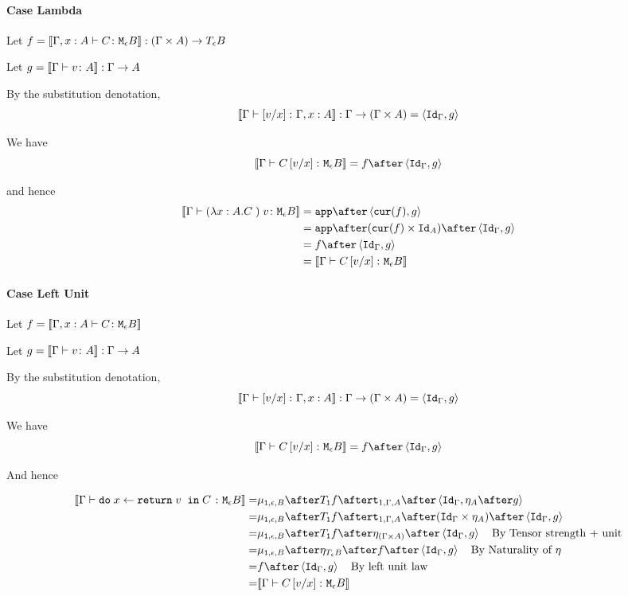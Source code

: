 {\paragraph{Case Lambda}
    Let $f = \deno{\typerelation{\gax}{C}{\meb}}: (\G \times A) \rightarrow\teb$

    Let $g = \deno{\gtyperelation{v}{A}}: \G \rightarrow A$

    By the substitution denotation, $$\deno{\typerelation{\G}{\ssub{x}{v}}{\gax}}: \G \rightarrow (\G \times A) = \pr{\idg}{g}$$

    We have $$\deno{\gtyperelation{C\ssub{x}{v}}{\meb}} = f \after \pr{\idg}{g}$$

    and hence
    \begin{equation}
        \begin{split}
            \deno{\gtyperelation{\apply{(\lam{x}{A}{C})}{v}}{\meb}} & = \app\after\pr{\cur{f}}{g} \\
            & = \app\after(\cur{f}\times\Id{A})\after\pr{\idg}{g}\\
            & = f \after \pr{\idg}{g} \\
            & = \deno{\gtyperelation{C\ssub{x}{v}}{\meb}}  
        \end{split}
    \end{equation}
   

\paragraph{Case Left Unit}
Let $f = \deno{\typerelation{\gax}{C}{\meb}}$

Let $g = \deno{\gtyperelation{v}{A}}: \G \rightarrow A$

By the substitution denotation, $$\deno{\typerelation{\G}{\ssub{x}{v}}{\gax}}: \G \rightarrow (\G \times A) = \pr{\idg}{g}$$

We have $$\deno{\gtyperelation{C\ssub{x}{v}}{\meb}} = f \after \pr{\idg}{g}$$

And hence

\begin{equation}
    \begin{split}
        \deno{\gtyperelation{\doin{x}{\return{v}}{C}}{\meb}} = &  \bind{\1}{\e}{B} \after \T{\1}{f} \after \tstrength{1}{\G}{A} \after \pr{\idg}{\point{A}\after g} \\
        = & \bind{\1}{\e}{B} \after \T{\1}{f} \after \tstrength{1}{\G}{A} \after (\idg\times \point{A}) \after \pr{\idg}{g} \\
        = & \bind{\1}{\e}{B} \after \T{\1}{f} \after \point{(\G \times A)} \after \pr{\idg}{g} \qt{By Tensor strength + unit}\\
        = & \bind{\1}{\e}{B}\after\point{\teb}\after f\after\pr{\idg}{g} \qt{By Naturality of $\point{}$}\\
        = & f\after\pr{\idg}{g} \qt{By left unit law}\\
        = & \deno{\gtyperelation{C\ssub{x}{v}}{\meb}}\\
    \end{split}
\end{equation}




}
